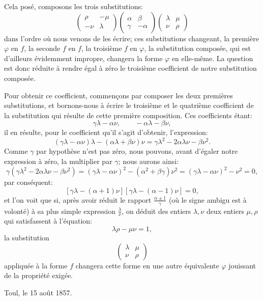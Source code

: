 \documentclass[11pt]{article}
\begin{document}
Cela posé, composons les trois substitutions:
\[
\begin{pmatrix}\rho&-\mu\\ -\nu&\lambda\end{pmatrix}
\begin{pmatrix}\alpha&\beta\\ \gamma&-\alpha\end{pmatrix}
\begin{pmatrix}\lambda&\mu\\ \nu&\rho\end{pmatrix}
\]
dans l'ordre où nous venons de les écrire; ces substitutions changeant, la première \(\varphi\) en \(f\), la seconde \(f\) en \(f\), la troisième \(f\) en \(\varphi\), la substitution composée, qui est d'ailleurs évidemment impropre, changera la forme \(\varphi\) en elle-même. La question est donc réduite à rendre égal à zéro le troisième coefficient de notre substitution composée.

Pour obtenir ce coefficient, commençons par composer les deux premières substitutions, et bornons-nous à écrire le troisième et le quatrième coefficient de la substitution qui résulte de cette première composition. Ces coefficients étant:
\[
\gamma\lambda-\alpha\nu,\qquad -\alpha\lambda-\beta\nu,
\]
il en résulte, pour le coefficient qu'il s'agit d'obtenir, l'expression:
\[
(\gamma\lambda-\alpha\nu)\lambda-(\alpha\lambda+\beta\nu)\nu
=\gamma\lambda^2-2\alpha\lambda\nu-\beta\nu^2.
\]
Comme \(\gamma\) par hypothèse n'est pas zéro, nous pouvons, avant d'égaler notre expression à zéro, la multiplier par \(\gamma\); nous aurons ainsi:
\[
\gamma(\gamma\lambda^2-2\alpha\lambda\nu-\beta\nu^2)
=(\gamma\lambda-\alpha\nu)^2-(\alpha^2+\beta\gamma)\nu^2
=(\gamma\lambda-\alpha\nu)^2-\nu^2=0,
\]
par conséquent:
\[
[\gamma\lambda-(\alpha+1)\nu][\gamma\lambda-(\alpha-1)\nu]=0,
\]
et l'on voit que si, après avoir réduit le rapport \(\frac{\alpha\pm1}{\gamma}\) (où le signe ambigu est à volonté) à sa plus simple expression \(\frac{\lambda}{\nu}\), on déduit des entiers \(\lambda,\nu\) deux entiers \(\mu,\rho\) qui satisfassent à l'équation:
\[
\lambda\rho-\mu\nu=1,
\]
la substitution
\[
\begin{pmatrix}\lambda&\mu\\ \nu&\rho\end{pmatrix}
\]
appliquée à la forme \(f\) changera cette forme en une autre équivalente \(\varphi\) jouissant de la propriété exigée.

\begin{flushright}
Toul, le 15 août 1857.
\end{flushright}
\end{document}
